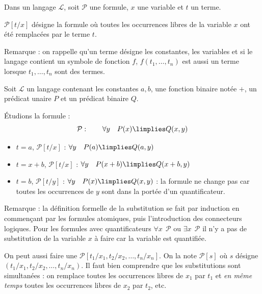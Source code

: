 \documentclass[11pt,class=report,crop=false]{standalone}
\begin{document}
Dans un langage $\mathcal{L}$, soit $\mathcal{P}$ une formule, $x$ une variable et $t$ un terme.

\begin{definition}
$\mathcal{P}[t/x]$ désigne la formule où toutes les occurrences libres de la variable $x$ ont été remplacées par le terme $t$.	
\end{definition}

Remarque : on rappelle qu'un terme désigne les constantes, les variables et si le langage contient un symbole de fonction $f$, $f(t_1,\ldots,t_n)$ est aussi un terme lorsque $t_1,\ldots,t_n$ sont des termes.

\begin{exemple}
Soit $\mathcal{L}$ un langage contenant les constantes $a,b$, une fonction binaire notée $+$, un prédicat unaire $P$ et un prédicat binaire $Q$.

Étudions la formule :
\[
\mathcal{P} : \qquad 
\forall y \quad  P(x) \limplies Q(x,y)
\]
\begin{itemize}
	\item $t=a$, $\mathcal{P}[t/x]$ : $\forall y \quad  P(a) \limplies Q(a,y)$

	\item $t=x+b$, $\mathcal{P}[t/x]$ : $\forall y \quad  P(x+b) \limplies Q(x+b,y)$
	
	\item $t=b$,  $\mathcal{P}[t/y]$ : $\forall y \quad  P(x) \limplies Q(x,y)$ : la formule ne change pas car toutes les occurrences de $y$ sont dans la portée d'un quantificateur.
\end{itemize}
\end{exemple}

Remarque : la définition formelle de la substitution se fait par induction en commençant par les formules atomiques, puis l'introduction des connecteurs logiques.
Pour les formules avec quantificateurs \og{}$\forall x \ \ \mathcal{P}$\fg{} ou \og{}$\exists x \ \ \mathcal{P}$\fg{} il n'y a pas de substitution de la variable $x$ à faire car la variable est quantifiée.

\bigskip

On peut aussi faire une  $\mathcal{P}[t_1/x_1, t_2/x_2,\ldots,t_n/x_n]$.
On la note $\mathcal{P}[s]$ où $s$ désigne $(t_1/x_1, t_2/x_2,\ldots,t_n/x_n)$.
Il faut bien comprendre que les substitutions sont simultanées : on remplace toutes les occurrences libres de $x_1$ par $t_1$ et \emph{en même temps} toutes les occurrences libres de $x_2$ par $t_2$, etc.
\end{document}
